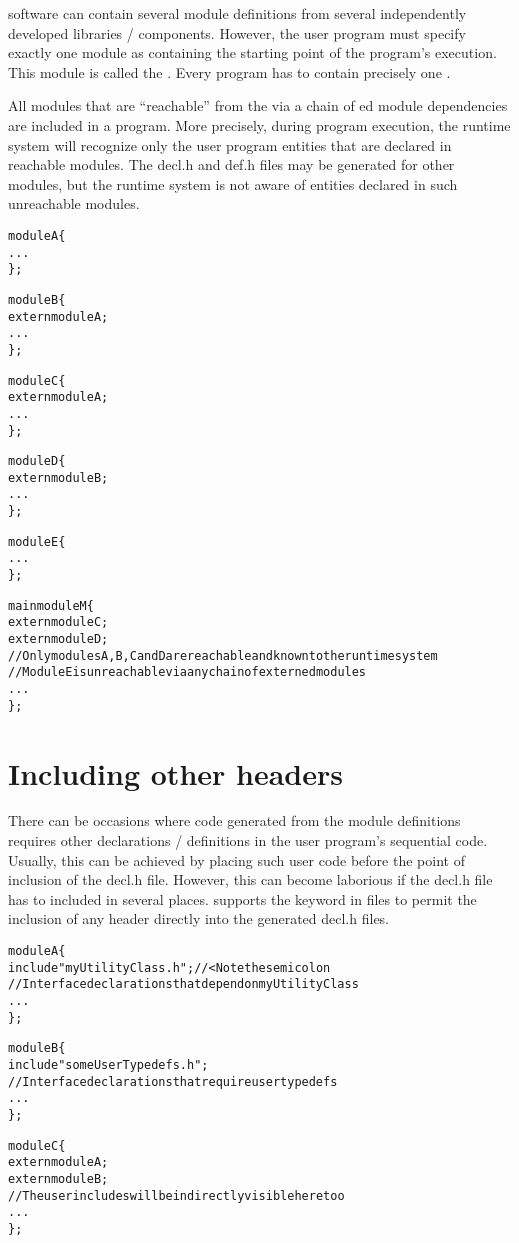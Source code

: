 \charm software can contain several module definitions from several
independently developed libraries / components. However, the user program must
specify exactly one module as containing the starting point of the program's
execution. This module is called the . Every \charm program
has to contain precisely one .

All modules that are ``reachable'' from the  via a chain of
ed module dependencies are included in a \charm program. More
precisely, during program execution, the \charm runtime system will recognize
only the user program entities that are declared in reachable modules. The
decl.h and def.h files may be generated for other modules, but the runtime
system is not aware of entities declared in such unreachable modules.

\begin{alltt}
module A \{
    ...
\};

module B \{
    extern module A;
    ...
\};

module C \{
    extern module A;
    ...
\};

module D \{
    extern module B;
    ...
\};

module E \{
    ...
\};

mainmodule M \{
    extern module C;
    extern module D;
    // Only modules A, B, C and D are reachable and known to the runtime system
    // Module E is unreachable via any chain of externed modules
    ...
\};
\end{alltt}


\section{Including other headers}

There can be occasions where code generated from the module definitions
requires other declarations / definitions in the user program's sequential
code. Usually, this can be achieved by placing such user code before the point
of inclusion of the decl.h file. However, this can become laborious if the
decl.h file has to included in several places. \charm supports the keyword
 in \ci files to permit the inclusion of any header directly into
the generated decl.h files.

\begin{alltt}
module A \{
    include "myUtilityClass.h"; //< Note the semicolon
    // Interface declarations that depend on myUtilityClass
    ...
\};

module B \{
    include "someUserTypedefs.h";
    // Interface declarations that require user typedefs
    ...
\};

module C \{
    extern module A;
    extern module B;
    // The user includes will be indirectly visible here too
    ...
\};
\end{alltt}


